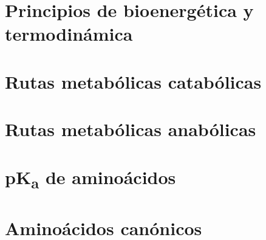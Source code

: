 \documentclass{AsignaturaResumen}
\begin{document}
    \chapter{Principios de bioenergética y termodinámica} 
    \chapter{Rutas metabólicas catabólicas} 
    \chapter{Rutas metabólicas anabólicas} 


    \appendix{}


\chapter{pK\textsubscript{a} de aminoácidos}
    

\chapter{Aminoácidos canónicos}
    
    
    
    \backmatter
    
\end{document}
